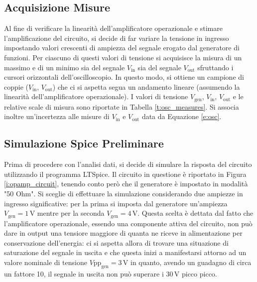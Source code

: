 \documentclass[a4paper,11pt]{article} %
\begin{document}

\subsection{Acquisizione Misure}
Al fine di verificare la linearità dell'amplificatore operazionale e stimare l'amplificazione del circuito, si decide di
far variare la tensione in ingresso impostando valori crescenti di ampiezza del segnale erogato dal generatore di
funzioni. Per ciascuno di questi valori di tensione si acquisisce la misura di un massimo e di un minimo sia del segnale
$V_{\text{in}}$ sia del segnale $V_{\text{out}}$ sfruttando i cursori orizzontali dell'oscilloscopio. In questo modo, si
ottiene un campione di coppie ($V_{\text{in}}$, $V_{\text{out}}$) che ci si aspetta segua un andamento lineare (assumendo
la linearità dell'amplificatore operazionale). I valori di tensione $V_{\text{gen}}$, $V_{\text{in}}$, $V_{\text{out}}$ e
le relative scale di misura sono riportate in Tabella \ref{t:osc_measures}. Si associa inoltre un'incertezza alle misure
di $V_{\text{in}}$ e $V_{\text{out}}$ data da Equazione \ref{e:osc}.\\


\subsection{Simulazione Spice Preliminare}\label{s:spice}
Prima di procedere con l'analisi dati, si decide di simulare la risposta del circuito utilizzando il programma LTSpice.
Il circuito in questione è riportato in Figura \ref{i:opamp_circuit}, tenendo conto però che il generatore è impostato
in modalità "50 Ohm". Si sceglie di effettuare la simulazione considerando due ampiezze in ingresso significative: per
la prima si imposta dal generatore un'ampiezza $V_{\text{gen}}=1\,\si{\volt}$ mentre per la seconda
$V_{\text{gen}}=4\,\si{\volt}$. Questa scelta è dettata dal fatto che l'amplificatore operazionale, essendo una
componente attiva del circuito, non può dare in output una tensiore maggiore di quanta ne riceve in alimentazione per
conservazione dell'energia: ci si aspetta allora di trovare una situazione di saturazione del segnale in uscita e che
questa inizi a manifestarsi attorno ad un valore nominale di tensione $V\text{pp}_{\text{gen}}=3\,\si{\volt}$ in quanto,
avendo un guadagno di circa un fattore 10, il segnale in uscita non può superare i $30\,\si{\volt}$
picco picco.
\end{document}
